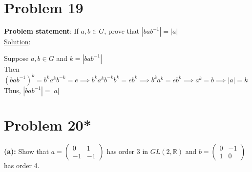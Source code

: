 \documentclass{article} %
\begin{document}
\newpage
\section*{Problem 19}


\textbf{Problem statement}: If $a,b \in G$, prove that $|bab^{-1}| = |a|$
\\

\underline{Solution}: 
\begin{addmargin}[1em]{0em}
Suppose $a,b \in G$ and $k = |bab^{-1}|$
\\Then $(bab^{-1})^{k} = b^ka^kb^{-k} = e \implies b^ka^kb^{-k}b^k = eb^k \implies b^ka^k = eb^k \implies a^k = b \implies |a| = k$
\\Thus, $|bab^{-1}| = |a|$
\end{addmargin}    

\newpage
\section*{Problem 20*}


\textbf{(a): }Show that $a = \left(\begin{matrix} 0 & 1 \\  -1 & -1 \end{matrix} \right)$ has order 3 in $GL(2,\mathbb{R})$ and $b = \left( \begin{matrix} 0 & -1 \\ 1 & 0\end{matrix} \right)$ has order 4.
\\
\end{document}
